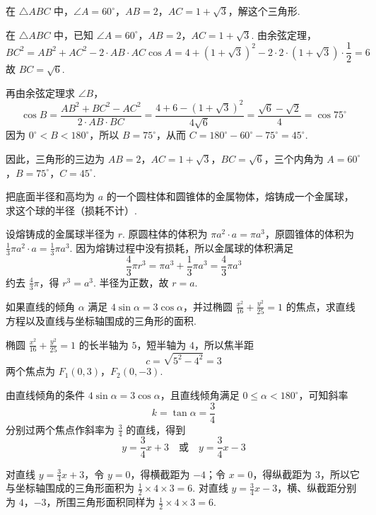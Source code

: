 \begin{problem}
在 \(\triangle ABC\) 中，\(\angle A=60^\circ\)，\(AB=2\)，\(AC=1+\sqrt{3}\)，解这个三角形.
\end{problem}

\begin{solution}
在 \(\triangle ABC\) 中，已知 \(\angle A=60^\circ\)，\(AB=2\)，\(AC=1+\sqrt3\). 由余弦定理，
\[
BC^2=AB^2+AC^2-2\cdot AB\cdot AC\cos A=4+(1+\sqrt3)^2-2\cdot2\cdot(1+\sqrt3)\cdot\frac12=6
\]
故 \(BC=\sqrt6\).

再由余弦定理求 \(\angle B\)，
\[
\cos B=\frac{AB^2+BC^2-AC^2}{2\cdot AB\cdot BC}=\frac{4+6-(1+\sqrt3)^2}{4\sqrt6}=\frac{\sqrt6-\sqrt2}{4}=\cos75^\circ
\]
因为 \(0^\circ<B<180^\circ\)，所以 \(B=75^\circ\)，从而 \(C=180^\circ-60^\circ-75^\circ=45^\circ\).

因此，三角形的三边为 \(AB=2\)，\(AC=1+\sqrt3\)，\(BC=\sqrt6\)，三个内角为 \(A=60^\circ\)，\(B=75^\circ\)，\(C=45^\circ\).
\end{solution}

\begin{problem}
把底面半径和高均为 \(a\) 的一个圆柱体和圆锥体的金属物体，熔铸成一个金属球，求这个球的半径（损耗不计）.
\end{problem}

\begin{solution}
设熔铸成的金属球半径为 \(r\). 原圆柱体的体积为 \(\pi a^2\cdot a=\pi a^3\)，原圆锥体的体积为 \(\frac13\pi a^2\cdot a=\frac13\pi a^3\). 因为熔铸过程中没有损耗，所以金属球的体积满足
\[
\frac43\pi r^3=\pi a^3+\frac13\pi a^3=\frac43\pi a^3
\]
约去 \(\frac43\pi\)，得 \(r^3=a^3\). 半径为正数，故 \(r=a\).
\end{solution}

\begin{problem}
如果直线的倾角 \(\alpha\) 满足 \(4\sin\alpha=3\cos\alpha\)，并过椭圆 \(\frac{x^2}{16}+\frac{y^2}{25}=1\) 的焦点，求直线方程以及直线与坐标轴围成的三角形的面积.
\end{problem}

\begin{solution}
椭圆 \(\frac{x^2}{16}+\frac{y^2}{25}=1\) 的长半轴为 \(5\)，短半轴为 \(4\)，所以焦半距
\[
c=\sqrt{5^2-4^2}=3
\]
两个焦点为 \(F_1(0,3)\)，\(F_2(0,-3)\).

由直线倾角的条件 \(4\sin\alpha=3\cos\alpha\)，且直线倾角满足 \(0\leq\alpha<180^\circ\)，可知斜率
\[
k=\tan\alpha=\frac34
\]
分别过两个焦点作斜率为 \(\frac34\) 的直线，得到
\[
y=\frac34x+3\quad\text{或}\quad y=\frac34x-3
\]

对直线 \(y=\frac34x+3\)，令 \(y=0\)，得横截距为 \(-4\)；令 \(x=0\)，得纵截距为 \(3\)，所以它与坐标轴围成的三角形面积为 \(\frac12\times4\times3=6\). 对直线 \(y=\frac34x-3\)，横、纵截距分别为 \(4\)，\(-3\)，所围三角形面积同样为 \(\frac12\times4\times3=6\).
\end{solution}

